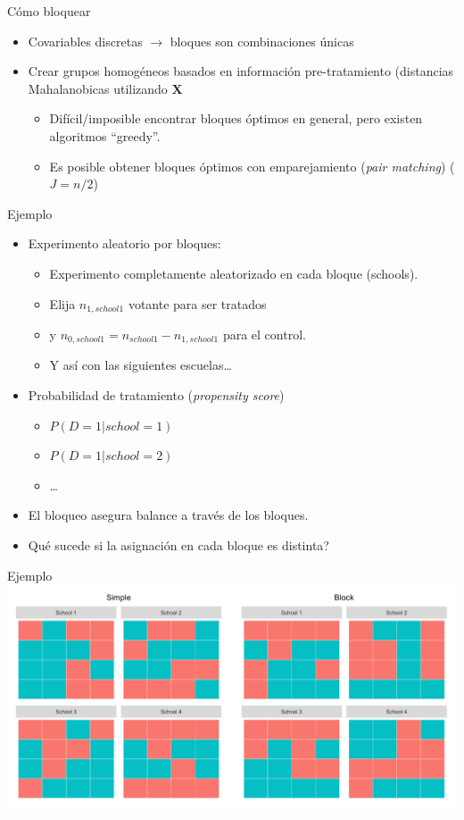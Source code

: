 \documentclass[
  ignorenonframetext,
]{beamer}
\providecommand{\tightlist}{%
  \setlength{\itemsep}{0pt}\setlength{\parskip}{0pt}}
\begin{document}
\begin{frame}{Cómo bloquear}
\protect\hypertarget{cuxf3mo-bloquear}{}
\begin{itemize}
\item
  Covariables discretas \(\rightarrow\) bloques son combinaciones únicas
  \pause
\item
  Crear grupos homogéneos basados en información pre-tratamiento
  (distancias Mahalanobicas utilizando \(\mathbf{X}\)

  \begin{itemize}
  \tightlist
  \item
    Difícil/imposible encontrar bloques óptimos en general, pero existen
    algoritmos ``greedy''.
  \item
    Es posible obtener bloques óptimos con emparejamiento (\emph{pair
    matching}) (\(J = n/2\))
  \end{itemize}
\end{itemize}
\end{frame}

\begin{frame}{Ejemplo}
\protect\hypertarget{ejemplo}{}
\begin{itemize}
\item
  Experimento aleatorio por bloques:

  \begin{itemize}
  \tightlist
  \item
    Experimento completamente aleatorizado en cada bloque (schools).
  \item
    Elija \(n_{1,school 1}\) votante para ser tratados
  \item
    y \(n_{0,school 1} = n_{school 1} - n_{1, school 1}\) para el
    control.
  \item
    Y así con las siguientes escuelas\ldots{} \pause
  \end{itemize}
\item
  Probabilidad de tratamiento (\emph{propensity score})

  \begin{itemize}
  \tightlist
  \item
    \(P(D = 1 | school = 1)\)
  \item
    \(P(D = 1 | school = 2)\)
  \item
    \ldots{} \pause
  \end{itemize}
\item
  El bloqueo asegura balance a través de los bloques. \pause 
\item
  Qué sucede si la asignación en cada bloque es distinta?
\end{itemize}
\end{frame}

\begin{frame}{Ejemplo}
\protect\hypertarget{ejemplo-1}{}
\includegraphics{figs/blocking}
\end{frame}
\end{document}
